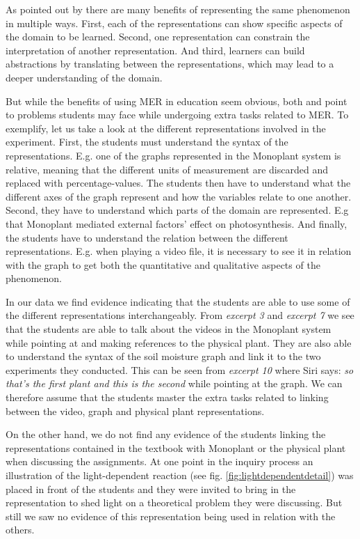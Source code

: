 As pointed out by \citet{van2006supporting} there are many benefits of representing the same phenomenon in multiple ways. First, each of the representations can show specific aspects of the domain to be learned. Second, one representation can constrain the interpretation of another representation. And third, learners can build abstractions by translating between the representations, which may lead to a deeper understanding of the domain. 

But while the benefits of using MER in education seem obvious, both \citet{ainsworth1999functions} and \citet{van2006supporting} point to problems students may face while undergoing extra tasks related to MER. To exemplify, let us take a look at the different representations involved in the experiment. First, the students must understand the syntax of the representations. E.g. one of the graphs represented in the Monoplant system is relative, meaning that the different units of measurement are discarded and replaced with percentage-values. The students then have to understand what the different axes of the graph represent and how the variables relate to one another. Second, they have to understand which parts of the domain are represented. E.g that Monoplant mediated external factors' effect on photosynthesis. And finally, the students have to understand the relation between the different representations. E.g. when playing a video file, it is necessary to see it in relation with the graph to get both the quantitative and qualitative aspects of the phenomenon. 

In our data we find evidence indicating that the students are able to use some of the different representations interchangeably. From \emph{excerpt 3} and \emph{excerpt 7} we see that the students are able to talk about the videos in the Monoplant system while pointing at and making references to the physical plant. They are also able to understand the syntax of the soil moisture graph and link it to the two experiments they conducted. This can be seen from \emph{excerpt 10} where Siri says: \emph{so that's the first plant and this is the second} while pointing at the graph. We can therefore assume that the students master the extra tasks related to linking between the video, graph and physical plant representations. 

On the other hand, we do not find any evidence of the students linking the representations contained in the textbook with Monoplant or the physical plant when discussing the assignments. At one point in the inquiry process an illustration of the light-dependent reaction (see fig. \ref{fig:lightdependentdetail}) was placed in front of the students and they were invited to bring in the representation to shed light on a theoretical problem they were discussing. But still we saw no evidence of this representation being used in relation with the others. 

